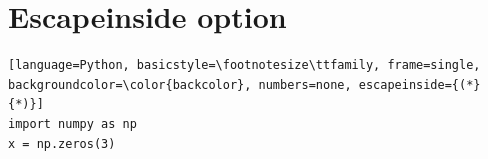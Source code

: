 \section{Escapeinside option}

\begin{lstlisting}[language=Python, basicstyle=\footnotesize\ttfamily, frame=single, backgroundcolor=\color{backcolor}, numbers=none, escapeinside={(*}{*)}]
import numpy as np
x = np.zeros(3)
\end{lstlisting}
